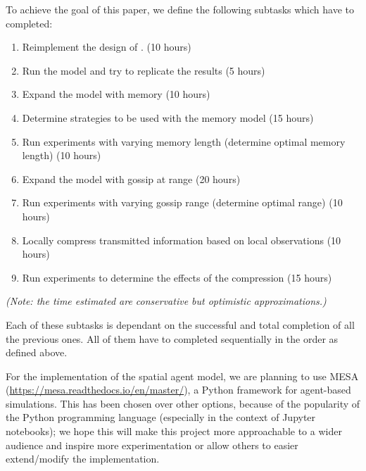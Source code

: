 \documentclass[english]{article}
\begin{document}
To achieve the goal of this paper, we define the following subtasks which have to completed:
\newcommand{\timeest}[1]{\hfill(#1 hours)}
\begin{enumerate}
  \item \label{subtasks:smaldino}
    Reimplement the design of \citet{smaldino}.
    \timeest{10}
  \item \label{subtasks:smaldino-experiments}
    Run the model and try to replicate the results
    \timeest{5}
  \item \label{subtasks:memory}
    Expand the model with memory
    \timeest{10}
  \item \label{subtasks:memory-strategies}
    Determine strategies to be used with the memory model
    \timeest{15}
  \item \label{subtasks:memory-experiments}
    Run experiments with varying memory length (determine optimal memory length)
    \timeest{10}
  \item \label{subtasks:gossip}
    Expand the model with gossip at range
    \timeest{20}
  \item \label{subtasks:gossip-experiments}
    Run experiments with varying gossip range (determine optimal range)
    \timeest{10}
  \item \label{subtasks:compress}
    Locally compress transmitted information based on local observations
    \timeest{10}
  \item \label{subtasks:compress-experiments}
    Run experiments to determine the effects of the compression
    \timeest{15}
\end{enumerate}
\textit{(Note: the time estimated are conservative but optimistic approximations.)}

Each of these subtasks is dependant on the successful and total completion of all the previous ones. All of them have to completed sequentially in the order as defined above.

For the implementation of the spatial agent model, we are planning to use MESA (\url{https://mesa.readthedocs.io/en/master/}), a Python framework for agent-based simulations. This has been chosen over other options, because of the popularity of the Python programming language (especially in the context of Jupyter notebooks); we hope this will make this project more approachable to a wider audience and inspire more experimentation or allow others to easier extend/modify the implementation.
\end{document}
